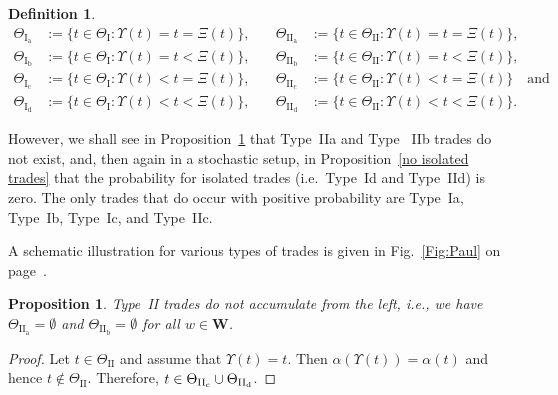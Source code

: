 \documentclass[11pt]{scrartcl}
\newtheorem{definition}[theorem]{Definition}
\newtheorem{proposition}[theorem]{Proposition}
\begin{document}
\begin{definition}
\begin{equation}
\begin{array}{ll}
\Theta_\mathrm{I_a} & :=\{t\in \Theta_\mathrm{I}: \Upsilon(t) = t = \Xi(t)
\}, \\ 
\Theta_\mathrm{I_b} & :=\{t\in \Theta_\mathrm{I}: \Upsilon(t) = t < \Xi(t)
\}, \\ 
\Theta_\mathrm{I_c} & :=\{t\in \Theta_\mathrm{I}: \Upsilon(t) < t = \Xi(t)
\}, \\ 
\Theta_\mathrm{I_d} & :=\{t\in \Theta_\mathrm{I}: \Upsilon(t) < t < \Xi(t)
\},%
\end{array}
\quad 
\begin{array}{ll}
\Theta_\mathrm{II_a} & :=\{t\in \Theta_\mathrm{II}: \Upsilon(t) = t = \Xi(t)
\}, \\ 
\Theta_\mathrm{II_b} & :=\{t\in \Theta_\mathrm{II}: \Upsilon(t) = t < \Xi(t)
\}, \\ 
\Theta_\mathrm{II_c} & :=\{t\in \Theta_\mathrm{II}: \Upsilon(t) < t = \Xi(t)
\}\quad\text{and} \\ 
\Theta_\mathrm{II_d} & :=\{t\in \Theta_\mathrm{II}: \Upsilon(t) < t < \Xi(t)
\}.%
\end{array}%
\end{equation}
\end{definition}

However, we shall see in Proposition~\ref{no-IIab} that Type~{IIa} and Type~{%
IIb} trades do not exist, and, then again in a stochastic setup, in
Proposition~\ref{no isolated trades} that the probability for isolated
trades (i.e.\ Type~{Id} and Type~{IId}) is zero. The only trades that do
occur with positive probability are Type~{Ia}, Type~{Ib}, Type~{Ic}, and
Type~{IIc}.

A schematic illustration for various types of trades is given 
in Fig.~\ref{Fig:Paul} on page~\pageref{Fig:Paul}.
\begin{proposition}\label{no-IIab} 
Type~{II} trades do not accumulate from the left, i.e., we
have $\Theta _{\mathrm{II_{a}}}=\emptyset $ and 
$\Theta _{\mathrm{II_{b}}}=\emptyset $ for all $w\in \mathbf{W}$.
\end{proposition}

\begin{proof}
Let $t\in \Theta_\mathrm{II}$ and assume that $\Upsilon (t)=t$. Then $\alpha
\left( \Upsilon (t)\right) =\alpha \left( t\right) $ and hence $t\notin
\Theta_\mathrm{II}$. Therefore, $t\in \Theta _{\mathrm{II_{c}}}\cup \Theta _{%
\mathrm{II_{d}}}$.
\end{proof}
\end{document}
